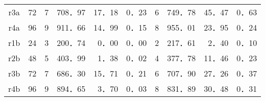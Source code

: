 \documentclass[a4j，11pt，twocolumn]{jsarticle}
\begin{document}
\begin{table*}
\begin{tabular}{cllrrrrrrr}
r3a                  & 72                       & 7                       & 708．97                    & 17．18                                                                  & 0．23                                                                        & 6                       & 749．78                    & 45．47                                                                  & 0．63                                                                       \\
r4a                  & 96                       & 9                       & 911．66                    & 14．99                                                                  & 0．15                                                                        & 8                       & 955．01                    & 23．95                                                                  & 0．24                                                                       \\
r1b                  & 24                       & 3                       & 200．74                    & 0．00                                                                   & 0．00                                                                        & 2                       & 217．61                    & 2．40                                                                   & 0．10                                                                       \\
r2b                  & 48                       & 5                       & 403．99                    & 1．38                                                                   & 0．02                                                                        & 4                       & 377．78                    & 11．46                                                                  & 0．23                                                                       \\
r3b                  & 72                       & 7                       & 686．30                    & 15．71                                                                  & 0．21                                                                        & 6                       & 707．90                    & 27．26                                                                  & 0．37                                                                       \\
r4b                  & 96                       & 9                       & 894．65                    & 3．70                                                                   & 0．03                                                                        & 8                       & 831．89                    & 30．48                                                                  & 0．31                                                                       \\ \hline
\end{tabular}
\end{table*}
\end{document}
